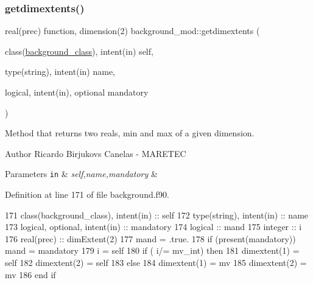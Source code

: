 \mbox{\label{namespacebackground__mod_a64c3966a113bc0f3b603c591bc345ca1}} 
\subsubsection{\texorpdfstring{getdimextents()}{getdimextents()}}
{\footnotesize\ttfamily real(prec) function, dimension(2) background\+\_\+mod\+::getdimextents (\begin{DoxyParamCaption}\item[{class(\mbox{\hyperlink{structbackground__mod_1_1background__class}{background\+\_\+class}}), intent(in)}]{self,  }\item[{type(string), intent(in)}]{name,  }\item[{logical, intent(in), optional}]{mandatory }\end{DoxyParamCaption})\hspace{0.3cm}{\ttfamily [private]}}



Method that returns two reals, min and max of a given dimension. 

\begin{DoxyAuthor}{Author}
Ricardo Birjukovs Canelas -\/ M\+A\+R\+E\+T\+EC 
\end{DoxyAuthor}

\begin{DoxyParams}[1]{Parameters}
\mbox{\tt in}  & {\em self,name,mandatory} & \\
\hline
\end{DoxyParams}


Definition at line 171 of file background.\+f90.


\begin{DoxyCode}
171     \textcolor{keywordtype}{class}(background\_class), \textcolor{keywordtype}{intent(in)} :: self
172     \textcolor{keywordtype}{type}(string), \textcolor{keywordtype}{intent(in)} :: name
173     \textcolor{keywordtype}{logical}, \textcolor{keywordtype}{optional}, \textcolor{keywordtype}{intent(in)} :: mandatory
174     \textcolor{keywordtype}{logical} :: mand
175     \textcolor{keywordtype}{integer} :: i
176     \textcolor{keywordtype}{real(prec)} :: dimExtent(2)
177     mand = .true.
178     \textcolor{keywordflow}{if} (\textcolor{keyword}{present}(mandatory)) mand = mandatory
179     i = self%
180     \textcolor{keywordflow}{if} ( i/= mv\_int) \textcolor{keywordflow}{then}
181         dimextent(1) = self%
182         dimextent(2) = self%
183     \textcolor{keywordflow}{else}
184         dimextent(1) = mv
185         dimextent(2) = mv
186 \textcolor{keywordflow}{    end if}
\end{DoxyCode}
\mbox{\label{namespacebackground__mod_a8a4c5fdcda63376bc3a984e9612dfb63}} 
